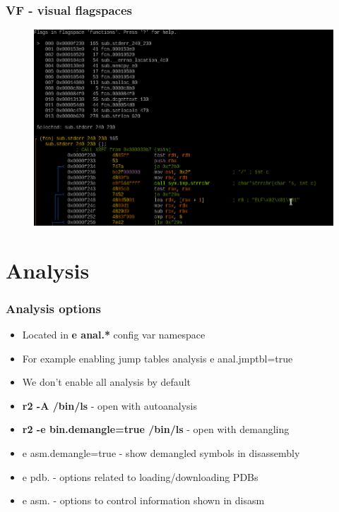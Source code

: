 \documentclass[10pt,pdf,utf8,english,compress,hyperref={unicode}]{beamer}
\begin{document}
\begin{frame}[fragile]
	\frametitle{VF - visual flagspaces}
	\begin{figure}
		\includegraphics[width=\linewidth]{r2visualflagspace.png}
	\end{figure}
\end{frame}

\section{Analysis}

\begin{frame}[fragile]
  \frametitle{Analysis options}
  \begin{itemize}
	  \item Located in \textbf{e anal.*} config var namespace
	  \item For example enabling jump tables analysis \alert{e anal.jmptbl=true}
	  \item We don't enable all analysis by default
	  \item \textbf{r2 -A /bin/ls} - open with autoanalysis
	  \item \textbf{r2 -e bin.demangle=true /bin/ls} - open with demangling
	  \item \alert{e asm.demangle=true} - show demangled symbols in disassembly
	  \item \alert{e pdb.} - options related to loading/downloading PDBs
	  \item \alert{e asm.} - options to control information shown in disasm
  \end{itemize}
\end{frame}
\end{document}
